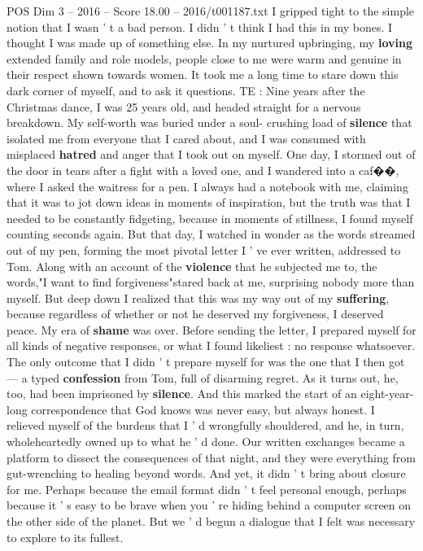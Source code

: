 \begin{textsample}{POS Dim 3 – 2016 – Score 18.00 – 2016/t001187.txt}
I gripped tight to the simple notion that I wasn ' t a bad person.
I didn ' t think I had this in my bones.
I thought I was made up of something else.
In my nurtured upbringing, my \textbf{loving} extended family and role models, people close to me were warm and genuine in their respect shown towards women.
It took me a long time to stare down this dark corner of myself, and to ask it questions.
TE : Nine years after the Christmas dance, I was 25 years old, and headed straight for a nervous breakdown.
My self-worth was buried under a soul- crushing load of \textbf{silence} that isolated me from everyone that I cared about, and I was consumed with misplaced \textbf{hatred} and anger that I took out on myself.
One day, I stormed out of the door in tears after a fight with a loved one, and I wandered into a caf{\EmojiFont �}{\EmojiFont �}, where I asked the waitress for a pen.
I always had a notebook with me, claiming that it was to jot down ideas in moments of inspiration, but the truth was that I needed to be constantly fidgeting, because in moments of stillness, I found myself counting seconds again.
But that day, I watched in wonder as the words streamed out of my pen, forming the most pivotal letter I ' ve ever written, addressed to Tom.
Along with an account of the \textbf{violence} that he subjected me to, the words,"I want to find forgiveness"stared back at me, surprising nobody more than myself.
But deep down I realized that this was my way out of my \textbf{suffering}, because regardless of whether or not he deserved my forgiveness, I deserved peace.
My era of \textbf{shame} was over.
Before sending the letter, I prepared myself for all kinds of negative responses, or what I found likeliest : no response whatsoever.
The only outcome that I didn ' t prepare myself for was the one that I then got — a typed \textbf{confession} from Tom, full of disarming regret.
As it turns out, he, too, had been imprisoned by \textbf{silence}.
And this marked the start of an eight-year-long correspondence that God knows was never easy, but always honest.
I relieved myself of the burdens that I ' d wrongfully shouldered, and he, in turn, wholeheartedly owned up to what he ' d done.
Our written exchanges became a platform to dissect the consequences of that night, and they were everything from gut-wrenching to healing beyond words.
And yet, it didn ' t bring about closure for me.
Perhaps because the email format didn ' t feel personal enough, perhaps because it ' s easy to be brave when you ' re hiding behind a computer screen on the other side of the planet.
But we ' d begun a dialogue that I felt was necessary to explore to its fullest.

\end{textsample}

